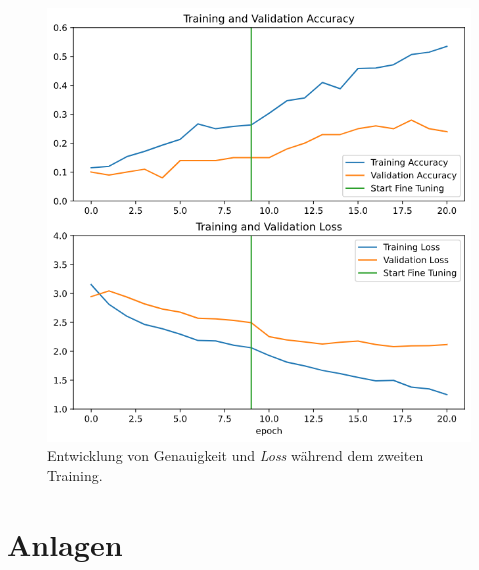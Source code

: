 \documentclass[a4paper,12pt,ngerman]{article}
\begin{document}
\newpage
\begin{figure}[ht]
\includegraphics[width=\linewidth]{second_training}
\centering
\caption{Entwicklung von Genauigkeit und \textit{Loss} während dem zweiten Training.}
\end{figure}


\newpage
\section{Anlagen}
\end{document}
